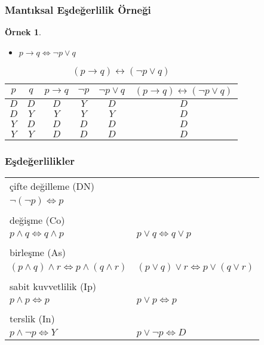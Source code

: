 \documentclass[dvipsnames]{beamer}
\theoremstyle{definition}
\theoremstyle{example}
\newtheorem{ornek}[theorem]{Örnek}
\theoremstyle{plain}
\begin{document}
\begin{frame}
  \frametitle{Mantıksal Eşdeğerlilik Örneği}

  \begin{ornek}
    \begin{itemize}
      \item $p \rightarrow q \Leftrightarrow \neg p \vee q$
    \end{itemize}

    \begin{table}
      \caption{$(p \rightarrow q) \leftrightarrow (\neg p \vee q)$}
      \begin{tabular}{|c|c|c|c|c||c|}\hline
        $p$ & $q$ & $p \rightarrow q$ & $\neg p$ & $\neg p \vee q$
            & $(p \rightarrow q) \leftrightarrow (\neg p \vee q)$\\\hline\hline
        $D$ & $D$ & $D$ & $Y$ & $D$ & $D$\\\hline
        $D$ & $Y$ & $Y$ & $Y$ & $Y$ & $D$\\\hline
        $Y$ & $D$ & $D$ & $D$ & $D$ & $D$\\\hline
        $Y$ & $Y$ & $D$ & $D$ & $D$ & $D$\\\hline
      \end{tabular}
    \end{table}
  \end{ornek}
\end{frame}

\begin{frame}
  \frametitle{Eşdeğerlilikler}

  \begin{tabular}{ll}
  \alert{çifte değilleme (DN)} &\\
    $\neg (\neg p) \Leftrightarrow p$ &\\\\
  \pause
  \alert{değişme (Co)} &\\
    $p \wedge q \Leftrightarrow q \wedge p$ &
    $p \vee q \Leftrightarrow q \vee p$\\\\
  \pause
  \alert{birleşme (As)} &\\
    $(p \wedge q) \wedge r \Leftrightarrow p \wedge (q \wedge r)$ &
    $(p \vee q) \vee r \Leftrightarrow p \vee (q \vee r)$\\\\
  \pause
  \alert{sabit kuvvetlilik (Ip)} &\\
    $p \wedge p \Leftrightarrow p$ &
    $p \vee p \Leftrightarrow p$\\\\
  \pause
  \alert{terslik (In)} &\\
    $p \wedge \neg p \Leftrightarrow Y$ &
    $p \vee \neg p \Leftrightarrow D$
  \end{tabular}
\end{frame}
\end{document}
